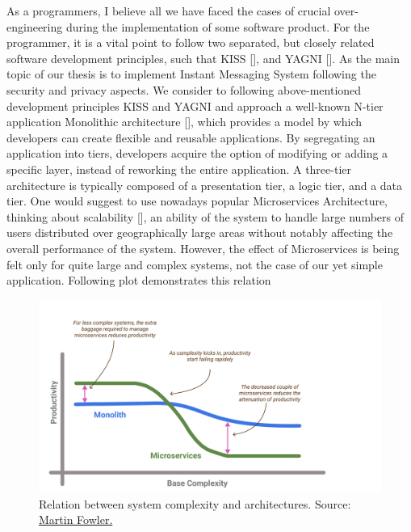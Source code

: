 As a programmers, I believe all we have faced the cases of crucial over-engineering during the implementation of some
software product.
For the programmer, it is a vital point to follow two separated, but closely related software development principles,
such that KISS [\cite{alwin2016kiss}], and YAGNI [\cite{da2018evolution}].
As the main topic of our thesis is to implement Instant Messaging System following the security and privacy aspects.
We consider to following above-mentioned development principles KISS and YAGNI and approach
a well-known N-tier application Monolithic architecture [\cite{bucchiarone2018monolithic}], which provides a model by which developers can
create flexible and reusable applications.
By segregating an application into tiers, developers acquire the option of modifying or adding a specific layer,
instead of reworking the entire application.
A three-tier architecture is typically composed of a presentation tier, a logic tier, and a data tier.
One would suggest to use nowadays popular Microservices Architecture, thinking about scalability [\cite{brataas2004exploring}],
an ability of the system to handle large numbers of users distributed over geographically large areas without
notably affecting the overall performance of the system.
However, the effect of Microservices is being felt only for quite large and complex systems,
not the case of our yet simple application.
Following plot demonstrates this relation

\begin{figure}[H]
    \centering
    \includegraphics[width=1\textwidth]{Pictures/Monolith_vs_Microservice.pdf}
    \caption{Relation between system complexity and architectures.
    Source: \href{https://martinfowler.com/bliki/MicroservicePremium.html}{Martin Fowler.}}
    \label{fig:monolith_vs_microservice}
\end{figure}

